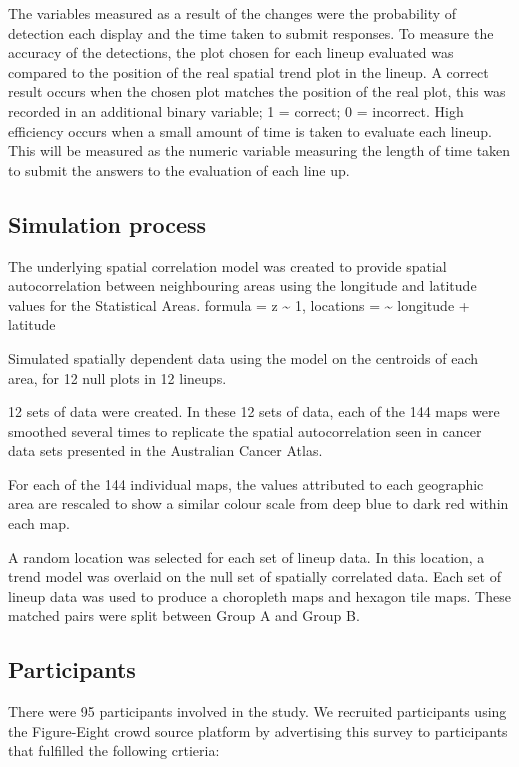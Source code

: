 \documentclass[conference,final,]{IEEEtran}
\begin{document}
The variables measured as a result of the changes were the probability
of detection each display and the time taken to submit responses. To
measure the accuracy of the detections, the plot chosen for each lineup
evaluated was compared to the position of the real spatial trend plot in
the lineup. A correct result occurs when the chosen plot matches the
position of the real plot, this was recorded in an additional binary
variable; 1 = correct; 0 = incorrect. High efficiency occurs when a
small amount of time is taken to evaluate each lineup. This will be
measured as the numeric variable measuring the length of time taken to
submit the answers to the evaluation of each line up.

\hypertarget{simulation-process}{%
\subsection{Simulation process}\label{simulation-process}}

The underlying spatial correlation model was created to provide spatial
autocorrelation between neighbouring areas using the longitude and
latitude values for the Statistical Areas. formula = z \textasciitilde{}
1, locations = \textasciitilde{} longitude + latitude

Simulated spatially dependent data using the model on the centroids of
each area, for 12 null plots in 12 lineups.

12 sets of data were created. In these 12 sets of data, each of the 144
maps were smoothed several times to replicate the spatial
autocorrelation seen in cancer data sets presented in the Australian
Cancer Atlas.

For each of the 144 individual maps, the values attributed to each
geographic area are rescaled to show a similar colour scale from deep
blue to dark red within each map.

A random location was selected for each set of lineup data. In this
location, a trend model was overlaid on the null set of spatially
correlated data. Each set of lineup data was used to produce a
choropleth maps and hexagon tile maps. These matched pairs were split
between Group A and Group B.

\hypertarget{participants}{%
\subsection{Participants}\label{participants}}

There were 95 participants involved in the study. We recruited
participants using the Figure-Eight crowd source platform by advertising
this survey to participants that fulfilled the following crtieria:
\end{document}
